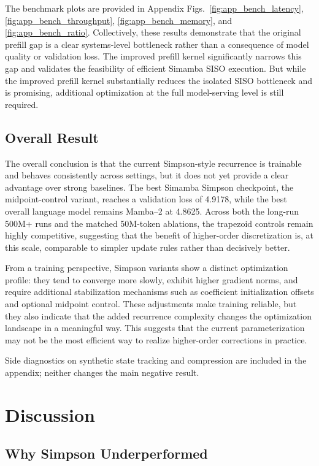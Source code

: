 \documentclass[conference]{IEEEtran}
\newcommand{\modelname}{Simamba\xspace}
\newcommand{\mambatwo}{Mamba--2\xspace}
\begin{document}
The benchmark plots are provided in Appendix Figs.~\ref{fig:app_bench_latency}, \ref{fig:app_bench_throughput}, \ref{fig:app_bench_memory}, and \ref{fig:app_bench_ratio}. Collectively, these results demonstrate that the original prefill gap is a clear systems-level bottleneck rather than a consequence of model quality or validation loss. The improved prefill kernel significantly narrows this gap and validates the feasibility of efficient \modelname SISO execution. But while the improved prefill kernel substantially reduces the isolated SISO bottleneck and is promising, additional optimization at the full model-serving level is still required.

\subsection{Overall Result}

The overall conclusion is that the current Simpson-style recurrence is trainable and behaves consistently across settings, but it does not yet provide a clear advantage over strong baselines. The best \modelname Simpson checkpoint, the midpoint-control variant, reaches a validation loss of 4.9178, while the best overall language model remains \mambatwo at 4.8625. Across both the long-run 500M+ runs and the matched 50M-token ablations, the trapezoid controls remain highly competitive, suggesting that the benefit of higher-order discretization is, at this scale, comparable to simpler update rules rather than decisively better.

From a training perspective, Simpson variants show a distinct optimization profile: they tend to converge more slowly, exhibit higher gradient norms, and require additional stabilization mechanisms such as coefficient initialization offsets and optional midpoint control. These adjustments make training reliable, but they also indicate that the added recurrence complexity changes the optimization landscape in a meaningful way. This suggests that the current parameterization may not be the most efficient way to realize higher-order corrections in practice.

Side diagnostics on synthetic state tracking and compression are included in the appendix; neither changes the main negative result.

\section{Discussion}

\subsection{Why Simpson Underperformed}
\end{document}
